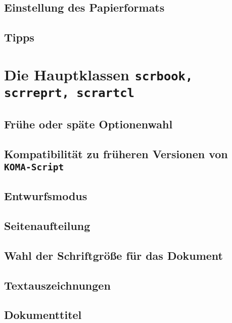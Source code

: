 \section{Einstellung des Papierformats}
\label{sec:Einfuehrung:Satzspiegelberechnung:Einstellung Papierformat}
\lipsum[1-1]
\section{Tipps}
\label{sec:Einfuehrung:Satzspiegelberechnung:Tipps}
\lipsum[1-1]

\chapter{Die Hauptklassen \texttt{scrbook, scrreprt, scrartcl}}
\label{chap:Einfuehrung:Hauptklassen}
\section{Frühe oder späte Optionenwahl}
\label{sec:Einfuehrung:Hauptklassen:Optionenwahl}
\lipsum[1-1]
\section{Kompatibilität zu früheren Versionen von \texttt{KOMA-Script}}
\label{sec:Einfuehrung:Hauptklassen:Kompatibilitaet}
\lipsum[1-1]
\section{Entwurfsmodus}
\label{sec:Einfuehrung:Hauptklassen:Entwurfsmodus}
\lipsum[1-1]
\section{Seitenaufteilung}
\label{sec:Einfuehrung:Hauptklassen:Seitenaufteilung}
\lipsum[1-1]
\section{Wahl der Schriftgröße für das Dokument}
\label{sec:Einfuehrung:Hauptklassen:Wahl Schriftgroesse}
\lipsum[1-1]
\section{Textauszeichnungen}
\label{sec:Einfuehrung:Hauptklassen:Textauszeichnungen}
\lipsum[1-1]
\section{Dokumenttitel}
\label{sec:Einfuehrung:Hauptklassen:Dokumenttitel}
\lipsum[1-1]
